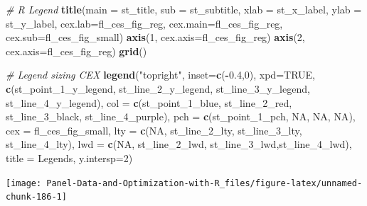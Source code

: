 \documentclass[
]{book}
\newenvironment{Shaded}{\begin{snugshade}}{\end{snugshade}}
\newcommand{\CommentTok}[1]{\textcolor[rgb]{0.56,0.35,0.01}{\textit{#1}}}
\newcommand{\DataTypeTok}[1]{\textcolor[rgb]{0.13,0.29,0.53}{#1}}
\newcommand{\DecValTok}[1]{\textcolor[rgb]{0.00,0.00,0.81}{#1}}
\newcommand{\FloatTok}[1]{\textcolor[rgb]{0.00,0.00,0.81}{#1}}
\newcommand{\KeywordTok}[1]{\textcolor[rgb]{0.13,0.29,0.53}{\textbf{#1}}}
\newcommand{\NormalTok}[1]{#1}
\newcommand{\OperatorTok}[1]{\textcolor[rgb]{0.81,0.36,0.00}{\textbf{#1}}}
\newcommand{\OtherTok}[1]{\textcolor[rgb]{0.56,0.35,0.01}{#1}}
\newcommand{\StringTok}[1]{\textcolor[rgb]{0.31,0.60,0.02}{#1}}
\begin{document}
\begin{Shaded}
\begin{Highlighting}[]
\CommentTok{\# R Legend}
\KeywordTok{title}\NormalTok{(}\DataTypeTok{main =}\NormalTok{ st\_title, }\DataTypeTok{sub =}\NormalTok{ st\_subtitle, }\DataTypeTok{xlab =}\NormalTok{ st\_x\_label, }\DataTypeTok{ylab =}\NormalTok{ st\_y\_label,}
      \DataTypeTok{cex.lab=}\NormalTok{fl\_ces\_fig\_reg,}
      \DataTypeTok{cex.main=}\NormalTok{fl\_ces\_fig\_reg,}
      \DataTypeTok{cex.sub=}\NormalTok{fl\_ces\_fig\_small)}
\KeywordTok{axis}\NormalTok{(}\DecValTok{1}\NormalTok{, }\DataTypeTok{cex.axis=}\NormalTok{fl\_ces\_fig\_reg)}
\KeywordTok{axis}\NormalTok{(}\DecValTok{2}\NormalTok{, }\DataTypeTok{cex.axis=}\NormalTok{fl\_ces\_fig\_reg)}
\KeywordTok{grid}\NormalTok{()}

\CommentTok{\# Legend sizing CEX}
\KeywordTok{legend}\NormalTok{(}\StringTok{"topright"}\NormalTok{,}
       \DataTypeTok{inset=}\KeywordTok{c}\NormalTok{(}\OperatorTok{{-}}\FloatTok{0.4}\NormalTok{,}\DecValTok{0}\NormalTok{),}
       \DataTypeTok{xpd=}\OtherTok{TRUE}\NormalTok{,}
       \KeywordTok{c}\NormalTok{(st\_point\_}\DecValTok{1}\NormalTok{\_y\_legend, st\_line\_}\DecValTok{2}\NormalTok{\_y\_legend, st\_line\_}\DecValTok{3}\NormalTok{\_y\_legend, st\_line\_}\DecValTok{4}\NormalTok{\_y\_legend),}
       \DataTypeTok{col =} \KeywordTok{c}\NormalTok{(st\_point\_}\DecValTok{1}\NormalTok{\_blue, st\_line\_}\DecValTok{2}\NormalTok{\_red, st\_line\_}\DecValTok{3}\NormalTok{\_black, st\_line\_}\DecValTok{4}\NormalTok{\_purple),}
       \DataTypeTok{pch =} \KeywordTok{c}\NormalTok{(st\_point\_}\DecValTok{1}\NormalTok{\_pch, }\OtherTok{NA}\NormalTok{, }\OtherTok{NA}\NormalTok{, }\OtherTok{NA}\NormalTok{),}
       \DataTypeTok{cex =}\NormalTok{ fl\_ces\_fig\_small,}
       \DataTypeTok{lty =} \KeywordTok{c}\NormalTok{(}\OtherTok{NA}\NormalTok{, st\_line\_}\DecValTok{2}\NormalTok{\_lty, st\_line\_}\DecValTok{3}\NormalTok{\_lty, st\_line\_}\DecValTok{4}\NormalTok{\_lty),}
       \DataTypeTok{lwd =} \KeywordTok{c}\NormalTok{(}\OtherTok{NA}\NormalTok{, st\_line\_}\DecValTok{2}\NormalTok{\_lwd, st\_line\_}\DecValTok{3}\NormalTok{\_lwd,st\_line\_}\DecValTok{4}\NormalTok{\_lwd),}
       \DataTypeTok{title =} \StringTok{\textquotesingle{}Legends\textquotesingle{}}\NormalTok{,}
       \DataTypeTok{y.intersp=}\DecValTok{2}\NormalTok{)}
\end{Highlighting}
\end{Shaded}

\begin{center}\texttt{[image: Panel-Data-and-Optimization-with-R\_files/figure-latex/unnamed-chunk-186-1]} \end{center}
\end{document}
